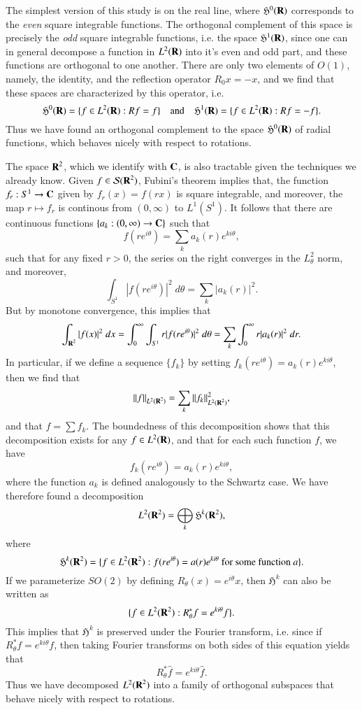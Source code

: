 The simplest version of this study is on the real line, where $\mathfrak{H}^0(\operatorname{\mathbf{R}})$ corresponds to the \emph{even} square integrable functions. The orthogonal complement of this space is precisely the \emph{odd} square integrable functions, i.e. the space $\mathfrak{H}^1(\operatorname{\mathbf{R}})$, since one can in general decompose a function in $L^2(\operatorname{\mathbf{R}})$ into it's even and odd part, and these functions are orthogonal to one another. There are only two elements of $O(1)$, namely, the identity, and the reflection operator $R_0x = -x$, and we find that these spaces are characterized by this operator, i.e.
%
\[ \mathfrak{H}^0(\operatorname{\mathbf{R}}) = \{ f \in L^2(\operatorname{\mathbf{R}}): Rf = f \} \quad\text{and}\quad \mathfrak{H}^1(\operatorname{\mathbf{R}}) = \{ f \in L^2(\operatorname{\mathbf{R}}): Rf = -f \}. \]
%
Thus we have found an orthogonal complement to the space $\mathfrak{H}^0(\operatorname{\mathbf{R}})$ of radial functions, which behaves nicely with respect to rotations.

The space $\operatorname{\mathbf{R}}^2$, which we identify with $\operatorname{\mathbf{C}}$, is also tractable given the techniques we already know. Given $f \in \mathcal{S}(\operatorname{\mathbf{R}}^2)$, Fubini's theorem implies that, the function $f_r: S^1 \to \operatorname{\mathbf{C}}$ given by $f_r(x) = f(rx)$ is square integrable, and moreover, the map $r \mapsto f_r$ is continous from $(0,\infty)$ to $L^1(S^1)$. It follows that there are continuous functions $\{ a_k: (0,\infty) \to \operatorname{\mathbf{C}} \}$ such that
%
\[ f(r e^{i\theta}) = \sum_k a_k(r) e^{ki \theta}, \]
%
such that for any fixed $r > 0$, the series on the right converges in the $L^2_\theta$ norm, and moreover,
%
\[ \int_{S^1} |f(r e^{i\theta})|^2\; d\theta = \sum_k |a_k(r)|^2. \]
%
But by monotone convergence, this implies that
%
\[ \int_{\operatorname{\mathbf{R}}^2} |f(x)|^2\; dx = \int_0^\infty \int_{S^1} r |f(r e^{i\theta})|^2\; d\theta = \sum_k \int_0^\infty r |a_k(r)|^2\; dr. \]
%
In particular, if we define a sequence $\{ f_k \}$ by setting $f_k(r e^{i \theta} ) = a_k(r) e^{k i \theta}$, then we find that
%
\[ \| f \|_{L^2(\operatorname{\mathbf{R}}^2)} = \sum_k \| f_k \|_{L^2(\operatorname{\mathbf{R}}^2)}^2, \]
%
and that $f = \sum f_k$. The boundedness of this decomposition shows that this decomposition exists for any $f \in L^2(\operatorname{\mathbf{R}})$, and that for each such function $f$, we have
%
\[ f_k(r e^{i \theta}) = a_k(r) e^{k i \theta}, \]
%
where the function $a_k$ is defined analogously to the Schwartz case. We have therefore found a decomposition
%
\[ L^2(\operatorname{\mathbf{R}}^2) = \bigoplus_k \mathfrak{H}^k(\operatorname{\mathbf{R}}^2), \]
%
where
%
\[ \mathfrak{H}^k(\operatorname{\mathbf{R}}^2) = \{ f \in L^2(\operatorname{\mathbf{R}}^2) : f(r e^{i \theta}) = a(r) e^{ki \theta}\ \text{for some function $a$} \}. \]
%
If we parameterize $SO(2)$ by defining $R_\theta(x) = e^{i \theta} x$, then $\mathfrak{H}^k$ can also be written as
%
\[ \{ f \in L^2(\operatorname{\mathbf{R}}^2) : R_\theta^* f = e^{k i \theta} f \}. \]
%
This implies that $\mathfrak{H}^k$ is preserved under the Fourier transform, i.e. since if $R_\theta^* f = e^{k i \theta} f$, then taking Fourier transforms on both sides of this equation yields that
%
\[ R_\theta^* \widehat{f} = e^{k i \theta} \widehat{f}. \]
%
Thus we have decomposed $L^2(\operatorname{\mathbf{R}}^2)$ into a family of orthogonal subspaces that behave nicely with respect to rotations.

